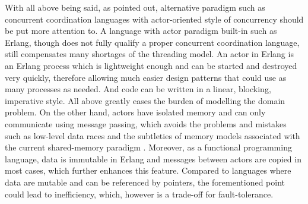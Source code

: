 With all above being said, as \textcite{Lee:2006:PT:1137232.1137289} pointed out, alternative paradigm such as concurrent coordination languages with actor-oriented style of concurrency should be put more attention to. A language with actor paradigm built-in such as Erlang, though does not fully qualify a proper concurrent coordination language, still compensates many shortages of the threading model. An actor in Erlang is an Erlang process which is lightweight enough and can be started and destroyed very quickly, therefore allowing 
much easier design patterns that could use as many processes as needed. And code can be written in a linear, blocking, imperative style. All above greatly eases the burden of modelling the domain problem. On the other hand, actors have isolated memory and can only communicate using message passing, which avoids the problems and mistakes such as low-level data races and the subtleties of memory models associated with the current shared-memory paradigm \autocite{UCAM-CL-TR-769}. Moreover, as a functional programming language, data is immutable in Erlang and messages between actors are copied in most cases, which further enhances this feature. Compared to languages where data are mutable and can be referenced by pointers, the 
forementioned point could lead to inefficiency, which, however is a trade-off for fault-tolerance.

